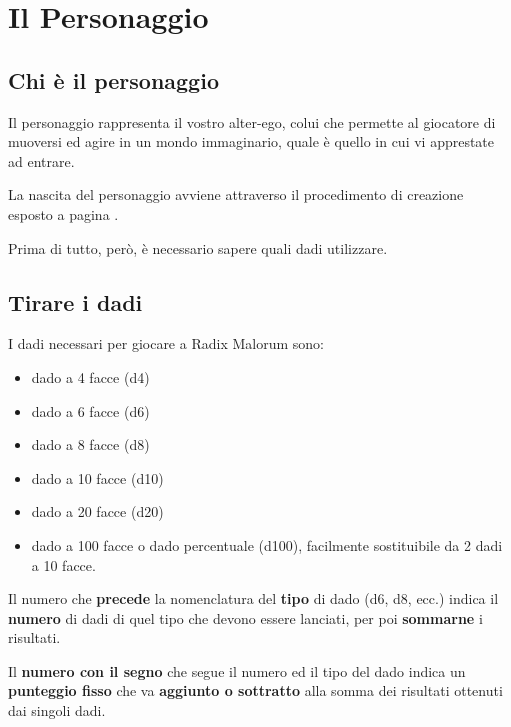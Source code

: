 
\chapter{Il Personaggio}
\label{personaggio}
\iffullversion
\section {Chi \`e il personaggio}

Il personaggio rappresenta il vostro alter-ego, colui che permette al
giocatore di muoversi ed agire in un mondo immaginario, quale \`e
quello in cui vi apprestate ad entrare.

La nascita del personaggio avviene attraverso il procedimento di
creazione esposto a pagina \pageref{creazione}. 

Prima di tutto, per\`o, \`e necessario sapere quali dadi
utilizzare.
\fi

\section{Tirare i dadi}
\label{dadi}
I dadi necessari per giocare a Radix Malorum sono:

\begin{itemize}
\itemsep -6pt
\item dado a 4 facce (d4)
\item dado a 6 facce (d6)
\item dado a 8 facce (d8)
\item dado a 10 facce (d10)
\item dado a 20 facce (d20)
\item dado a 100 facce o dado percentuale (d100), facilmente
  sostituibile da 2 dadi a 10 facce.
\end{itemize}

Il numero che \textbf{precede} la nomenclatura del \textbf{tipo} di
dado (d6, d8, ecc.) indica il \textbf{numero} di dadi di quel tipo che
devono essere lanciati, per poi \textbf{sommarne} i risultati.

Il \textbf{numero con il segno} che segue il numero ed il tipo del dado indica
un \textbf{punteggio fisso} che va \textbf{aggiunto o sottratto} alla somma dei
risultati ottenuti dai singoli dadi.


